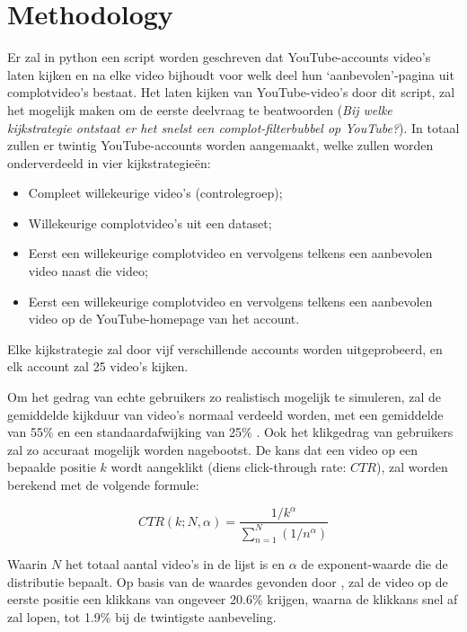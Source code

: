 \documentclass[../main.tex]{subfiles}
\begin{document}
\section{Methodology}

Er zal in python een script worden geschreven dat YouTube-accounts video’s laten kijken en na elke video bijhoudt voor welk deel hun ‘aanbevolen’-pagina uit complotvideo’s bestaat. Het laten kijken van YouTube-video's door dit script, zal het mogelijk maken om de eerste deelvraag te beatwoorden (\textit{Bij welke kijkstrategie ontstaat er het snelst een complot-filterbubbel op YouTube?}). In totaal zullen er twintig YouTube-accounts worden aangemaakt, welke zullen worden onderverdeeld in vier kijkstrategieën:

\begin{itemize}
    \item Compleet willekeurige video’s (controlegroep);
    \item Willekeurige complotvideo’s uit een dataset;
    \item Eerst een willekeurige complotvideo en vervolgens telkens een aanbevolen video naast die video;
    \item Eerst een willekeurige complotvideo en vervolgens telkens een aanbevolen video op de YouTube-homepage van het account.
\end{itemize}

\noindent Elke kijkstrategie zal door vijf verschillende accounts worden uitgeprobeerd, en elk account zal 25 video’s kijken.   

Om het gedrag van echte gebruikers zo realistisch mogelijk te simuleren, zal de gemiddelde kijkduur van video’s normaal verdeeld worden, met een gemiddelde van 55\% en een standaardafwijking van 25\% \citep{park2016data}. Ook het klikgedrag van gebruikers zal zo accuraat mogelijk worden nagebootst. De kans dat een video op een bepaalde positie $k$ wordt aangeklikt (diens click-through rate: $CTR$), zal worden berekend met de volgende formule:

\begin{equation}
CTR(k; N, \alpha) = \frac{1/k^\alpha}{\sum_{n=1}^{N} (1/n^\alpha)}
\end{equation}

\noindent Waarin $N$ het totaal aantal video's in de lijst is en $\alpha$ de exponent-waarde die de distributie bepaalt. Op basis van de waardes gevonden door \citet{zhou2010impact}, zal de video op de eerste positie een klikkans van ongeveer 20.6\% krijgen, waarna de klikkans snel af zal lopen, tot 1.9\% bij de twintigste aanbeveling. 
\end{document}

